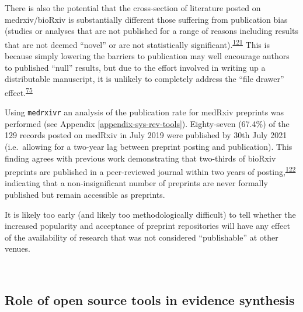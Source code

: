 \documentclass[a4paper, twoside]{templates/ociamthesis}
\begin{document}
There is also the potential that the cross-section of literature posted on medrxiv/bioRxiv is substantially different those suffering from publication bias (studies or analyses that are not published for a range of reasons including results that are not deemed ``novel'' or are not statistically significant).\textsuperscript{\protect\hyperlink{ref-song2010}{121}} This is because simply lowering the barriers to publication may well encourage authors to published ``null'' results, but due to the effort involved in writing up a distributable manuscript, it is unlikely to completely address the ``file drawer'' effect.\textsuperscript{\protect\hyperlink{ref-rosenthal1979}{75}}

Using \texttt{medrxivr} an analysis of the publication rate for medRxiv preprints was performed (see Appendix \ref{appendix-sys-rev-tools}). Eighty-seven (67.4\%) of the 129 records posted on medRxiv in July 2019 were published by 30th July 2021 (i.e.~allowing for a two-year lag between preprint posting and publication). This finding agrees with previous work demonstrating that two-thirds of bioRxiv preprints are published in a peer-reviewed journal within two years of posting,\textsuperscript{\protect\hyperlink{ref-abdill2019b}{122}} indicating that a non-insignificant number of preprints are never formally published but remain accessible as preprints.

It is likely too early (and likely too methodologically difficult) to tell whether the increased popularity and acceptance of preprint repositories will have any effect of the availability of research that was not considered ``publishable'' at other venues.

~

\hypertarget{role-of-open-source-tools-in-evidence-synthesis}{%
\subsection{Role of open source tools in evidence synthesis}\label{role-of-open-source-tools-in-evidence-synthesis}}
\end{document}
